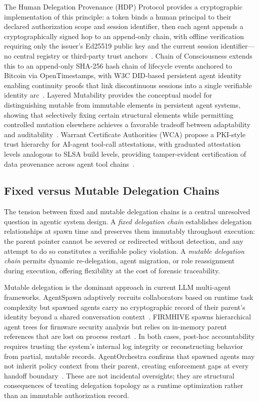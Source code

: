 The Human Delegation Provenance (HDP) Protocol provides a cryptographic implementation of this principle: a token binds a human principal to their declared authorization scope and session identifier, then each agent appends a cryptographically signed hop to an append-only chain, with offline verification requiring only the issuer's Ed25519 public key and the current session identifier---no central registry or third-party trust anchors~\cite{hdp-draft}. Chain of Consciousness extends this to an append-only SHA-256 hash chain of lifecycle events anchored to Bitcoin via OpenTimestamps, with W3C DID-based persistent agent identity enabling continuity proofs that link discontinuous sessions into a single verifiable identity arc~\cite{chainofconsciousness2026}. Layered Mutability provides the conceptual model for distinguishing mutable from immutable elements in persistent agent systems, showing that selectively fixing certain structural elements while permitting controlled mutation elsewhere achieves a favorable tradeoff between adaptability and auditability~\cite{layeredmutability2026}. Warrant Certificate Authorities (WCA) propose a PKI-style trust hierarchy for AI-agent tool-call attestations, with graduated attestation levels analogous to SLSA build levels, providing tamper-evident certification of data provenance across agent tool chains~\cite{wca-draft}.

\subsection{Fixed versus Mutable Delegation Chains}
\label{sec:delegation-chains}

The tension between fixed and mutable delegation chains is a central unresolved question in agentic system design. A \emph{fixed delegation chain} establishes delegation relationships at spawn time and preserves them immutably throughout execution: the parent pointer cannot be severed or redirected without detection, and any attempt to do so constitutes a verifiable policy violation. A \emph{mutable delegation chain} permits dynamic re-delegation, agent migration, or role reassignment during execution, offering flexibility at the cost of forensic traceability.

Mutable delegation is the dominant approach in current LLM multi-agent frameworks. AgentSpawn adaptively recruits collaborators based on runtime task complexity but spawned agents carry no cryptographic record of their parent's identity beyond a shared conversation context~\cite{agentspawn2025}. FIRMHIVE spawns hierarchical agent trees for firmware security analysis but relies on in-memory parent references that are lost on process restart~\cite{firmhive2025}. In both cases, post-hoc accountability requires trusting the system's internal log integrity or reconstructing behavior from partial, mutable records. AgentOrchestra confirms that spawned agents may not inherit policy context from their parent, creating enforcement gaps at every handoff boundary~\cite{agentorchestra2025}. These are not incidental oversights; they are structural consequences of treating delegation topology as a runtime optimization rather than an immutable authorization record.

